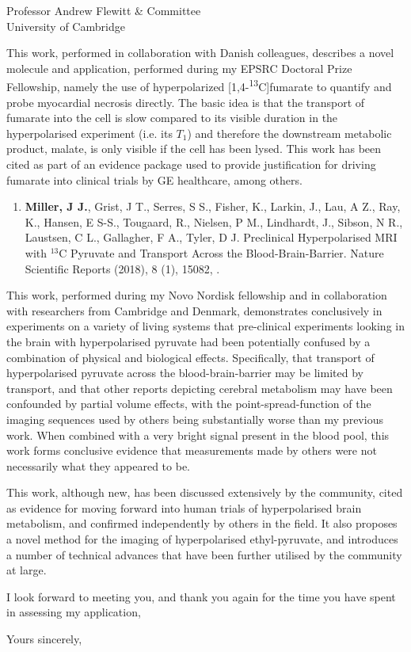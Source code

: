 \documentclass[xelatex,nofoundrysterling]{oxphysicsletter} %
\begin{document}
\begin{letter}{\vspace*{-0em}

Professor Andrew Flewitt \& Committee \\
University of Cambridge }
    This work, performed in collaboration with Danish colleagues, describes a novel molecule and application, performed during my EPSRC Doctoral Prize Fellowship, namely the use of hyperpolarized [1,4-\textsuperscript{13}C]fumarate to quantify and probe myocardial necrosis directly. The basic idea is that the transport of fumarate into the cell is slow compared to its visible duration in the hyperpolarised experiment (i.e. its $T_1$) and therefore the downstream metabolic product, malate, is only visible if the cell has been lysed. This work has been cited as part of an evidence package used to provide justification for driving fumarate into clinical trials by GE healthcare, among others.

    \begin{enumerate}[resume] 
\item \textbf{Miller, J J.}, Grist, J T., Serres, S S., Fisher, K., Larkin, J., Lau, A Z., Ray, K.,  Hansen, E S-S., Tougaard, R., Nielsen, P M., Lindhardt, J., Sibson, N R., Laustsen, C L., Gallagher, F A., Tyler, D J. Preclinical Hyperpolarised MRI with $^{13}$C Pyruvate and Transport Across the Blood-Brain-Barrier. Nature Scientific Reports (2018), 8 (1), 15082, . 
    \end{enumerate} 

    This work, performed during my Novo Nordisk fellowship and in collaboration with researchers from Cambridge and Denmark, demonstrates conclusively in experiments on a variety of living systems that pre-clinical experiments looking in the brain with hyperpolarised pyruvate had been potentially confused by a combination of physical and biological effects. Specifically, that transport of hyperpolarised pyruvate across the blood-brain-barrier may be limited by transport, and that other reports depicting cerebral metabolism may have been confounded by partial volume effects, with the point-spread-function of the imaging sequences used by others being substantially worse than my previous work.  When combined with a very bright signal present in the blood pool, this work forms conclusive evidence that measurements made by others were not necessarily what they appeared to be.

    This work, although new, has been discussed extensively by the community, cited as evidence for moving forward into human trials of hyperpolarised brain metabolism, and confirmed independently by others in  the field. It also proposes a novel method  for the  imaging of hyperpolarised ethyl-pyruvate, and introduces a number of technical advances that  have been further utilised by the community at large. 

I look forward to meeting you, and thank you again for the time you have spent in assessing my application, 

\closing{\vspace{-2em}Yours sincerely,\vspace*{-1em}} %
\end{letter}
\end{document}
